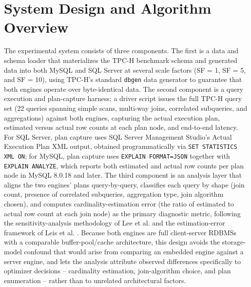 \documentclass[conference]{IEEEtran}
\begin{document}
\section{System Design and Algorithm Overview}
The experimental system consists of three components. The first is a data and schema loader that materializes the TPC-H benchmark schema and generated data into both MySQL and SQL Server at several scale factors (SF = 1, SF = 5, and SF = 10), using TPC-H's standard \texttt{dbgen} data generator to guarantee that both engines operate over byte-identical data. The second component is a query execution and plan-capture harness: a driver script issues the full TPC-H query set (22 queries spanning simple scans, multi-way joins, correlated subqueries, and aggregations) against both engines, capturing the actual execution plan, estimated versus actual row counts at each plan node, and end-to-end latency. For SQL Server, plan capture uses SQL Server Management Studio's Actual Execution Plan XML output, obtained programmatically via \texttt{SET STATISTICS XML ON}; for MySQL, plan capture uses \texttt{EXPLAIN FORMAT=JSON} together with \texttt{EXPLAIN ANALYZE}, which reports both estimated and actual row counts per plan node in MySQL 8.0.18 and later. The third component is an analysis layer that aligns the two engines' plans query-by-query, classifies each query by shape (join count, presence of correlated subqueries, aggregation type, join algorithm chosen), and computes cardinality-estimation error (the ratio of estimated to actual row count at each join node) as the primary diagnostic metric, following the sensitivity-analysis methodology of Lee et al. \cite{lee2023} and the estimation-error framework of Leis et al. \cite{leis2015}. Because both engines are full client-server RDBMSs with a comparable buffer-pool/cache architecture, this design avoids the storage-model confound that would arise from comparing an embedded engine against a server engine, and lets the analysis attribute observed differences specifically to optimizer decisions -- cardinality estimation, join-algorithm choice, and plan enumeration -- rather than to unrelated architectural factors.
\end{document}
